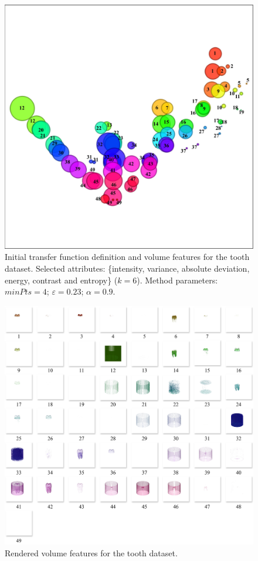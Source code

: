 \begin{figure}[htb!]
    \centering
    \includegraphics[width=0.7\columnwidth]{figs/tooth-clusters-tf.jpg} 
    \caption{Initial transfer function definition and volume features for the tooth dataset. Selected attributes: \{intensity, variance, absolute deviation, energy, contrast and entropy\} (\(k=6\)). Method parameters: $minPts=4$; $\varepsilon=0.23$; $\alpha=0.9$.}
    \label{fig:tooth-clusters-tf}
\end{figure}

\begin{figure}[htb!]
    \centering
    \includegraphics[width=\columnwidth]{figs/tooth-clusters.jpg} 
    \caption{Rendered volume features for the tooth dataset.}
    \label{fig:tooth-clusters}
\end{figure}

